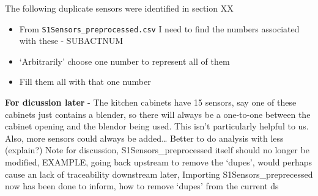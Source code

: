 \documentclass[11pt,]{article}
\providecommand{\tightlist}{%
  \setlength{\itemsep}{0pt}\setlength{\parskip}{0pt}}
\begin{document}
The following duplicate sensors were identified in section XX

\begin{itemize}
\tightlist
\item
  From \texttt{S1Sensors\_preprocessed.csv} I need to find the numbers
  associated with these - SUBACTNUM
\item
  `Arbitrarily' choose one number to represent all of them
\item
  Fill them all with that one number
\end{itemize}

\textbf{For dicussion later} - The kitchen cabinets have 15 sensors, say
one of these cabinets just contains a blender, so there will always be a
one-to-one between the cabinet opening and the blendor being used. This
isn't particularly helpful to us. Also, more sensors could always be
added\ldots{} Better to do analysis with less (explain?) Note for
discussion, S1Sensors\_preprocessed itself should no longer be modified,
EXAMPLE, going back upstream to remove the `dupes', would perhaps cause
an lack of traceability downstream later, Importing
S1Sensors\_preprecessed now has been done to inform, how to remove
`dupes' from the current ds
\end{document}

